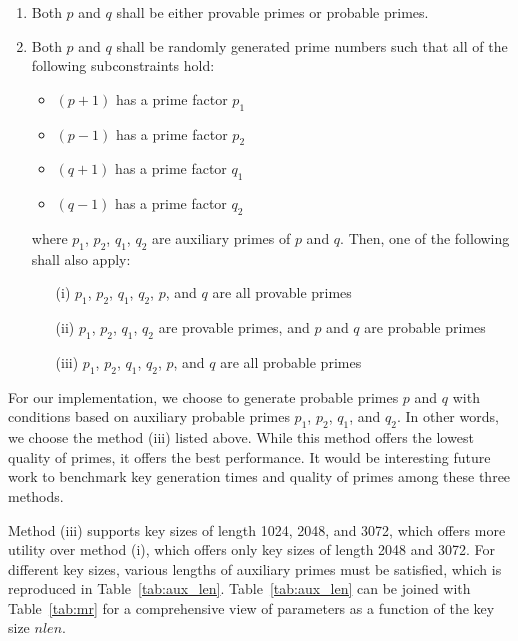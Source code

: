 \documentclass[a4paper]{article}
\begin{document}
\begin{enumerate}
    \item Both $p$ and $q$ shall be either provable primes or probable primes.

    \item Both $p$ and $q$ shall be randomly generated prime numbers such that all of the following subconstraints hold:

        \begin{itemize}
            \item $(p+1)$ has a prime factor $p_1$
            \item $(p-1)$ has a prime factor $p_2$
            \item $(q+1)$ has a prime factor $q_1$
            \item $(q-1)$ has a prime factor $q_2$
        \end{itemize}

    where $p_1$, $p_2$, $q_1$, $q_2$ are auxiliary primes of $p$ and $q$. Then, one of the following shall also apply:

    \begin{enumerate}
        \item[(i)] $p_1$, $p_2$, $q_1$, $q_2$, $p$, and $q$ are all provable primes

        \item[(ii)] $p_1$, $p_2$, $q_1$, $q_2$ are provable primes, and $p$ and $q$ are probable primes
        \item[(iii)] $p_1$, $p_2$, $q_1$, $q_2$, $p$, and $q$ are all probable primes
    \end{enumerate}
\end{enumerate}

For our implementation, we choose to generate probable primes $p$ and $q$ with conditions based on auxiliary probable primes $p_1$, $p_2$, $q_1$, and $q_2$. In other words, we choose the method (iii) listed above. While this method offers the lowest quality of primes, it offers the best performance. It would be interesting future work to benchmark key generation times and quality of primes among these three methods.

Method (iii) supports key sizes of length 1024, 2048, and 3072, which offers more utility over method (i), which offers only key sizes of length 2048 and 3072. For different key sizes, various lengths of auxiliary primes must be satisfied, which is reproduced in Table~\ref{tab:aux_len}. Table~\ref{tab:aux_len} can be joined with Table~\ref{tab:mr} for a comprehensive view of parameters as a function of the key size $nlen$.
\end{document}
